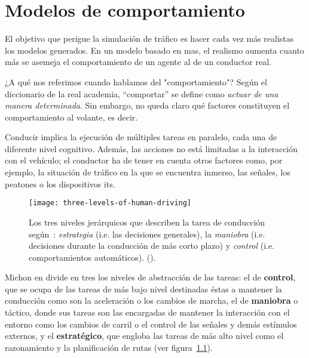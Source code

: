 \chapter{Modelos de comportamiento}
\label{ch:sota-behavior-models}

El objetivo que perigue la simulación de tráfico es hacer cada vez más realistas los modelos generados. En un modelo basado en \gls{mas}, el realismo aumenta cuanto más se asemeja el comportamiento de un agente al de un conductor real.

¿A qué nos referimos cuando hablamos del "comportamiento"? Según el diccionario de la real academia, \enquote{comportar} se define como \textit{actuar de una manera determinada}. Sin embargo, no queda claro qué factores constituyen el comportamiento al volante, es decir.

Conducir implica la ejecución de múltiples tareas en paralelo, cada una de diferente nivel cognitivo. Además, las acciones no está limitadas a la interacción con el vehículo; el conductor ha de tener en cuenta otros factores como, por ejemplo, la situación de tráfico en la que se encuentra inmerso, las señales, los peatones o los dispositivos \gls{its}.

\begin{figure}
	\centering
	\texttt{[image: three-levels-of-human-driving]}
	\caption{Los tres niveles jerárquicos que describen la tarea de conducción según~\cite{michon1985critical}: \textit{estrategia} (i.e. las decisiones generales), la \textit{maniobra} (i.e. decisiones durante la conducción de más corto plazo) y \textit{control} (i.e. comportamientos automáticos). ().}
	\label{fig:three-levels-of-human-driving}
\end{figure}

Michon en \cite{michon1985critical} divide en tres los niveles de abstracción de las tareas: el de \textbf{control}, que se ocupa de las tareas de más bajo nivel destinadas éstas a mantener la conducción como son la aceleración o los cambios de marcha, el de \textbf{maniobra} o táctico, donde sus tareas son las encargadas de mantener la interacción con el entorno como los cambios de carril o el control de las señales y demás estímulos externos, y el \textbf{estratégico}, que engloba las tareas de más alto nivel como el razonamiento y la planificación de rutas (ver figura~\ref{fig:three-levels-of-human-driving}).

